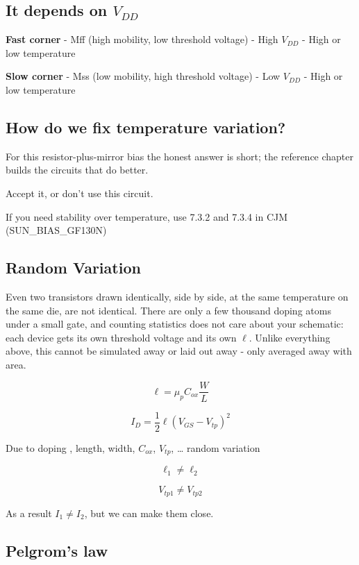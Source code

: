\subsection{\texorpdfstring{It depends on
\(V_{DD}\)}{It depends on V\_\{DD\}}}\label{it-depends-on-v_dd}

\textbf{Fast corner} - Mff (high mobility, low threshold voltage) - High
\(V_{DD}\) - High or low temperature

\textbf{Slow corner} - Mss (low mobility, high threshold voltage) - Low
\(V_{DD}\) - High or low temperature

\subsection{How do we fix temperature
variation?}\label{how-do-we-fix-temperature-variation}

For this resistor-plus-mirror bias the honest answer is short; the
reference chapter builds the circuits that do better.

Accept it, or don't use this circuit.

If you need stability over temperature, use 7.3.2 and 7.3.4 in CJM
(SUN\_BIAS\_GF130N)

\subsection{Random Variation}\label{random-variation}

Even two transistors drawn identically, side by side, at the same
temperature on the same die, are not identical. There are only a few
thousand doping atoms under a small gate, and counting statistics does
not care about your schematic: each device gets its own threshold
voltage and its own \(\ell\). Unlike everything above, this cannot be
simulated away or laid out away - only averaged away with area.

\[\ell =  \mu_p C_{ox} \frac{W}{L}\]

\[ I_D = \frac{1}{2} \ell (V_{GS} - V_{tp})^2\]

Due to doping , length, width, \(C_{ox}\), \(V_{tp}\), \ldots{} random
variation

\[\ell_1 \ne \ell_2\]

\[V_{tp1} \ne V_{tp2} \]

As a result \(I_1 \ne I_2\), but we can make them close.

\subsection{\texorpdfstring{Pelgrom's law
}{Pelgrom's law {[}2{]}}}\label{pelgroms-law-pelgrom89}

